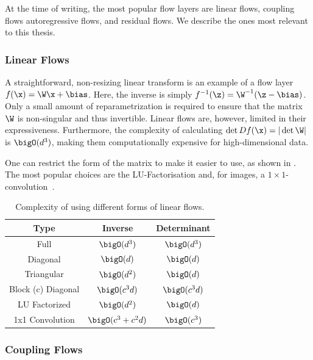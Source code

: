 At the time of writing, the most popular flow layers are linear flows, coupling flows autoregressive flows, and residual flows.
We describe the ones most relevant to this thesis.

\subsubsection{Linear Flows}

A straightforward, non-resizing linear transform is an example of a flow layer $f(\x) = \W\x + \bias$.
Here, the inverse is simply $f^{-1}(\z) = \W^{-1}(\z - \bias)$.
Only a small amount of reparametrization is required to ensure that the matrix $\W$ is non-singular and thus invertible.
Linear flows are, however, limited in their expressiveness.
Furthermore, the complexity of calculating $\det D f(\x) = |\det \W|$ is $\bigO(d^3)$, making them computationally expensive for high-dimensional data.

One can restrict the form of the matrix to make it easier to use, as shown in .
The most popular choices are the LU-Factorisation and, for images, a $1\times1$-convolution~\cite{GlowGenerativeFlow}.

\begin{table}[h!]
    \centering
    \caption{Complexity of using different forms of linear flows.}
    \label{tab:linear_flows}
    \begin{tabular}{ccc}
    \toprule
    \textbf{Type} & \textbf{Inverse} & \textbf{Determinant} \\
    \midrule
    Full & $\bigO(d^3)$ & $\bigO(d^3)$ \\
    Diagonal & $\bigO(d)$ & $\bigO(d)$ \\
    Triangular & $\bigO(d^2)$ & $\bigO(d)$ \\
    Block (c) Diagonal & $\bigO(c^3d)$ & $\bigO(c^3d)$ \\
    LU Factorized & $\bigO(d^2)$ & $\bigO(d)$ \\
    1x1 Convolution & $\bigO(c^3 + c^2d)$ & $\bigO(c^3)$ \\
    \bottomrule
    \end{tabular}
\end{table}

\subsubsection{Coupling Flows}

